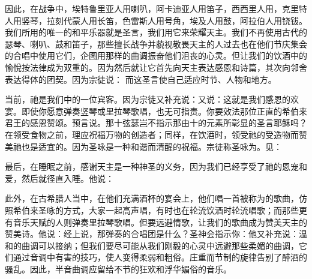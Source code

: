 因此，在战争中，埃特鲁里亚人用喇叭，阿卡迪亚人用笛子，西西里人用，克里特人用竖琴，拉刻代蒙人用长笛，色雷斯人用号角，埃及人用鼓，阿拉伯人用铙钹。我们所用的唯一的和平乐器就是圣言，我们用它来荣耀天主。我们不再使用古代的瑟琴、喇叭、鼓和笛子，那些擅长战争并藐视敬畏天主的人过去也在他们节庆集会的合唱中使用它们，企图用那样的曲调振奋他们沮丧的心灵。但让我们的饮酒中的愉悅按法律成为双重的。因为然后就让它首先向天主表达感恩和诗篇，其次向邻舍表达得体的团契。因为宗徒说： 而这圣言使自己适应时节、人物和地方。\par

当前，祂是我们中的一位宾客。因为宗徒又补充说：又说：这就是我们感恩的欢宴。即使你愿意弹奏竖琴或里拉琴歌唱，也无可指责。你要效法那位正直的希伯来君王的感恩赞颂。预言说。那十弦瑟岂不指示那由十的元素所彰显的圣言耶稣吗？在领受食物之前，理应祝福万物的创造者；同样，在饮酒时，领受祂的受造物而赞美祂也是适宜的。因为圣咏是一种和谐而清醒的祝福。宗徒称圣咏为。见：\par

最后，在睡眠之前，感谢天主是一种神圣的义务，因为我们已经享受了祂的恩宠和爱，然后就径直入睡。他说：\par

此外，在古希腊人当中，在他们充满酒杯的宴会上，他们唱一首被称为的歌曲，仿照希伯来圣咏的方式，大家一起高声唱，有时也在轮流饮酒时轮流唱歌；而那些更有音乐天赋的人则弹奏里拉琴歌唱。但要远避情歌，让我们的歌曲成为赞美天主的赞美诗。他说：经上说，那弹奏的合唱团是什么？圣神会指示你：他又补充说：温和的曲调可以接纳；但我们要尽可能从我们刚毅的心灵中远避那些柔媚的曲调，它们通过音调中有害的技巧，使人变得柔弱和粗俗。庄重而节制的旋律告别了醉酒的骚乱。因此，半音曲调应留给不节的狂欢和浮华媚俗的音乐。\par


